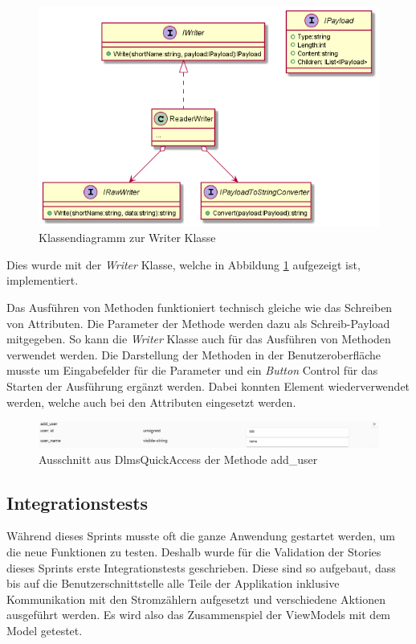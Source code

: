 \begin{figure}
   \centering
   \includegraphics[width=1.0\textwidth]{gfx/payloadTostriing.png}
   \caption{
      Klassendiagramm zur Writer Klasse
      }
      \label{fig:writer}
   \end{figure}
Dies wurde mit der \textit{Writer} Klasse, welche in Abbildung \ref{fig:writer} aufgezeigt ist, implementiert.


Das Ausführen von Methoden funktioniert technisch gleiche wie das Schreiben von Attributen.
Die Parameter der Methode werden dazu als Schreib-Payload mitgegeben.
So kann die \textit{Writer} Klasse auch für das Ausführen von Methoden verwendet werden.
Die Darstellung der Methoden in der Benutzeroberfläche musste um Eingabefelder für die Parameter und ein \textit{Button} Control für das Starten der Ausführung ergänzt werden.
Dabei konnten Element wiederverwendet werden, welche auch bei den Attributen eingesetzt werden.
\begin{figure}
   \centering
   \includegraphics[width=1.0\textwidth]{gfx/addUserMethod.png}
   \caption{
      Ausschnitt aus DlmsQuickAccess der Methode add\_user
      }
      \label{fig:addUserMethod}
   \end{figure}



\subsection{Integrationstests}
Während dieses Sprints musste oft die ganze Anwendung gestartet werden, um die neue Funktionen zu testen.
Deshalb wurde für die Validation der Stories dieses Sprints erste Integrationstests geschrieben.
Diese sind so aufgebaut, dass bis auf die Benutzerschnittstelle alle Teile der Applikation inklusive Kommunikation mit den Stromzählern aufgesetzt und verschiedene Aktionen ausgeführt werden.
Es wird also das Zusammenspiel der ViewModels mit dem Model getestet.

